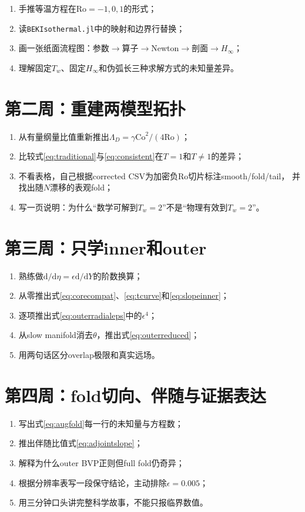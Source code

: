 \documentclass[UTF8,zihao=-4,openany]{ctexbook}
\newcommand{\eps}{\epsilon}
\newcommand{\Ro}{\mathrm{Ro}}
\newcommand{\Co}{\mathrm{Co}}
\newcommand{\dd}{\mathrm{d}}
\begin{document}
\begin{enumerate}
 \item 手推等温方程在$\Ro=-1,0,1$的形式；
 \item 读\texttt{BEKIsothermal.jl}中的映射和边界行替换；
 \item 画一张纸面流程图：参数$\to$算子$\to$Newton$\to$剖面$\to H_\infty$；
 \item 理解固定$T_w$、固定$H_\infty$和伪弧长三种求解方式的未知量差异。
\end{enumerate}

\section{第二周：重建两模型拓扑}

\begin{enumerate}
 \item 从有量纲量比值重新推出$\Lambda_D=\gamma\Co^2/(4\Ro)$；
 \item 比较式\eqref{eq:traditional}与\eqref{eq:consistent}在$T=1$和$T\ne1$的差异；
  \item 不看表格，自己根据corrected CSV为加密负$\Ro$切片标注smooth/fold/tail，
  并找出随$N$漂移的表观fold；
 \item 写一页说明：为什么“数学可解到$T_w=2$”不是“物理有效到$T_w=2$”。
\end{enumerate}

\section{第三周：只学inner和outer}

\begin{enumerate}
 \item 熟练做$\dd/\dd\eta=\eps\dd/\dd Y$的阶数换算；
 \item 从零推出式\eqref{eq:corecompat}、\eqref{eq:tcurve}和\eqref{eq:slopeinner}；
 \item 逐项推出式\eqref{eq:outerradialeps}中的$\eps^4$；
 \item 从slow manifold消去$\theta$，推出式\eqref{eq:outerreduced}；
 \item 用两句话区分overlap极限和真实远场。
\end{enumerate}

\section{第四周：fold切向、伴随与证据表达}

\begin{enumerate}
 \item 写出式\eqref{eq:augfold}每一行的未知量与方程数；
 \item 推出伴随比值式\eqref{eq:adjointslope}；
 \item 解释为什么outer BVP正则但full fold仍奇异；
 \item 根据分辨率表写一段保守结论，主动排除$\eps=0.005$；
 \item 用三分钟口头讲完整科学故事，不能只报临界数值。
\end{enumerate}
\end{document}
